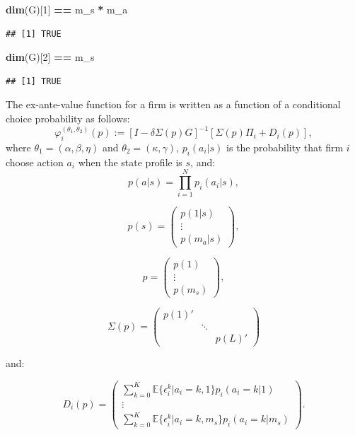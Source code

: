 \documentclass[]{book}
\newenvironment{Shaded}{\begin{snugshade}}{\end{snugshade}}
\newcommand{\KeywordTok}[1]{\textcolor[rgb]{0.13,0.29,0.53}{\textbf{#1}}}
\newcommand{\DecValTok}[1]{\textcolor[rgb]{0.00,0.00,0.81}{#1}}
\newcommand{\StringTok}[1]{\textcolor[rgb]{0.31,0.60,0.02}{#1}}
\newcommand{\OperatorTok}[1]{\textcolor[rgb]{0.81,0.36,0.00}{\textbf{#1}}}
\newcommand{\NormalTok}[1]{#1}
\begin{document}
\begin{Shaded}
\begin{Highlighting}[]
\KeywordTok{dim}\NormalTok{(G)[}\DecValTok{1}\NormalTok{] }\OperatorTok{==}\StringTok{ }\NormalTok{m_s }\OperatorTok{*}\StringTok{ }\NormalTok{m_a}
\end{Highlighting}
\end{Shaded}

\begin{verbatim}
## [1] TRUE
\end{verbatim}

\begin{Shaded}
\begin{Highlighting}[]
\KeywordTok{dim}\NormalTok{(G)[}\DecValTok{2}\NormalTok{] }\OperatorTok{==}\StringTok{ }\NormalTok{m_s}
\end{Highlighting}
\end{Shaded}

\begin{verbatim}
## [1] TRUE
\end{verbatim}

The ex-ante-value function for a firm is written as a function of a
conditional choice probability as follows: \[
\varphi_i^{(\theta_1, \theta_2)}(p) := [I - \delta \Sigma(p) G]^{-1}[\Sigma(p)\Pi_i + D_i(p)],
\] where \(\theta_1 = (\alpha, \beta, \eta)\) and
\(\theta_2 = (\kappa, \gamma)\), \(p_i(a_i|s)\) is the probability that
firm \(i\) choose action \(a_i\) when the state profile is \(s\), and:
\[
p(a|s) = \prod_{i = 1}^N p_i(a_i|s), 
\]

\[
p(s) = 
\begin{pmatrix}
p(1|s) \\
\vdots \\
p(m_a|s)
\end{pmatrix},
\]

\[
p = 
\begin{pmatrix}
p(1)\\
\vdots\\
p(m_s)
\end{pmatrix},
\]

\[
\Sigma(p) =
\begin{pmatrix}
p(1)' & & \\
 & \ddots & \\
 & & p(L)'
\end{pmatrix}
\]

and:

\[
D_i(p) =
\begin{pmatrix}
\sum_{k = 0}^K \mathbb{E}\{\epsilon_i^k|a_i = k, 1\}p_i(a_i = k|1)\\
\vdots\\
\sum_{k = 0}^K \mathbb{E}\{\epsilon_i^k|a_i = k, m_s\}p_i(a_i = k|m_s)
\end{pmatrix}.
\]
\end{document}
